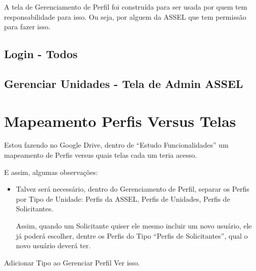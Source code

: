 A tela de Gerenciamento de Perfil foi construída para ser usada por quem tem responsabilidade para isso. Ou seja, por alguem da ASSEL que tem permissão para fazer isso.


\subsection{Login - Todos}


\subsection{Gerenciar Unidades - Tela de Admin ASSEL}


\section{Mapeamento Perfis Versus Telas}

Estou fazendo no Google Drive, dentro de ``Estudo Funcionalidades'' um mapeamento de Perfis versus quais telas cada um teria acesso.

E assim, algumas observações:


\begin{itemize}
	\item Talvez será necessário, dentro do Gerenciamento de Perfil, separar os Perfis por Tipo de Unidade: Perfis da ASSEL, Perfis de Unidades, Perfis de Solicitantes.
	
	Assim, quando um Solicitante quiser ele mesmo incluir um novo usuário, ele já poderá escolher, dentre os Perfis do Tipo ``Perfis de Solicitantes'', qual o novo usuário deverá ter.	
\end{itemize}


	\begin{funcionalidade}{Adicionar Tipo ao Gerenciar Perfil}
		Ver isso.
	\end{funcionalidade}

















